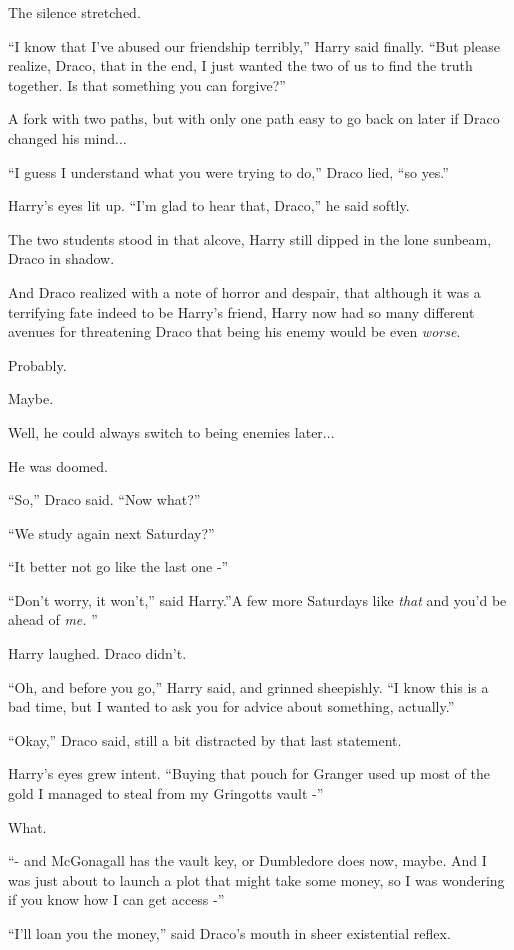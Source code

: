 The silence stretched.

``I know that I've abused our friendship terribly,'' Harry said finally.
``But please realize, Draco, that in the end, I just wanted the two of
us to find the truth together. Is that something you can forgive?''

A fork with two paths, but with only one path easy to go back on later
if Draco changed his mind...

``I guess I understand what you were trying to do,'' Draco lied, ``so
yes.''

Harry's eyes lit up. ``I'm glad to hear that, Draco,'' he said softly.

The two students stood in that alcove, Harry still dipped in the lone
sunbeam, Draco in shadow.

And Draco realized with a note of horror and despair, that although it
was a terrifying fate indeed to be Harry's friend, Harry now had so many
different avenues for threatening Draco that being his enemy would be
even \emph{worse}.

Probably.

Maybe.

Well, he could always switch to being enemies later...

He was doomed.

``So,'' Draco said. ``Now what?''

``We study again next Saturday?''

``It better not go like the last one -''

``Don't worry, it won't,'' said Harry.''A few more Saturdays like
\emph{that} and you'd be ahead of \emph{me.} ''

Harry laughed. Draco didn't.

``Oh, and before you go,'' Harry said, and grinned sheepishly. ``I know
this is a bad time, but I wanted to ask you for advice about something,
actually.''

``Okay,'' Draco said, still a bit distracted by that last statement.

Harry's eyes grew intent. ``Buying that pouch for Granger used up most
of the gold I managed to steal from my Gringotts vault -''

What.

``- and McGonagall has the vault key, or Dumbledore does now, maybe. And
I was just about to launch a plot that might take some money, so I was
wondering if you know how I can get access -''

``I'll loan you the money,'' said Draco's mouth in sheer existential
reflex.

